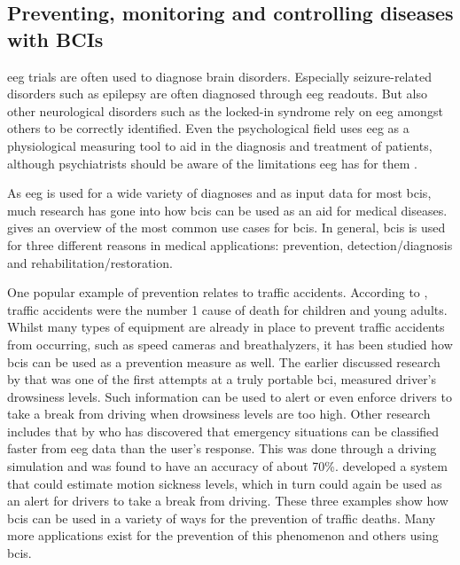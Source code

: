 
\subsection{Preventing, monitoring and controlling diseases with BCIs}
\label{subsec:bci_helping_disabled_diseases}

\Gls{eeg} trials are often used to diagnose brain disorders.
Especially seizure-related disorders such as epilepsy are often diagnosed through \gls{eeg} readouts.
But also other neurological disorders such as the locked-in syndrome rely on \gls{eeg} amongst others to be correctly identified.
Even the psychological field uses \gls{eeg} as a physiological measuring tool to aid in the diagnosis and treatment of patients, although psychiatrists should be aware of the limitations \gls{eeg} has for them \citep{eeg_for_psychiatric}.

As \gls{eeg} is used for a wide variety of diagnoses and as input data for most \glspl{bci}, much research has gone into how \glspl{bci} can be used as an aid for medical diseases.
 gives an overview of the most common use cases for \glspl{bci}.
In general, \glspl{bci} is used for three different reasons in medical applications: prevention, detection/diagnosis and rehabilitation/restoration.

One popular example of prevention relates to traffic accidents.
According to \citet{traffic_deaths}, traffic accidents were the number 1 cause of death for children and young adults.
Whilst many types of equipment are already in place to prevent traffic accidents from occurring, such as speed cameras and breathalyzers, it has been studied how \glspl{bci} can be used as a prevention measure as well.
The earlier discussed research by \citet{early_bci_drowsiness} that was one of the first attempts at a truly portable \gls{bci}, measured driver's drowsiness levels.
Such information can be used to alert or even enforce drivers to take a break from driving when drowsiness levels are too high.
Other research includes that by \citet{eeg_dangerous_situation_car} who has discovered that emergency situations can be classified faster from \gls{eeg} data than the user's response.
This was done through a driving simulation and was found to have an accuracy of about 70\%.
 developed a system that could estimate motion sickness levels, which in turn could again be used as an alert for drivers to take a break from driving.
These three examples show how \glspl{bci} can be used in a variety of ways for the prevention of traffic deaths.
Many more applications exist for the prevention of this phenomenon and others using \glspl{bci}.

